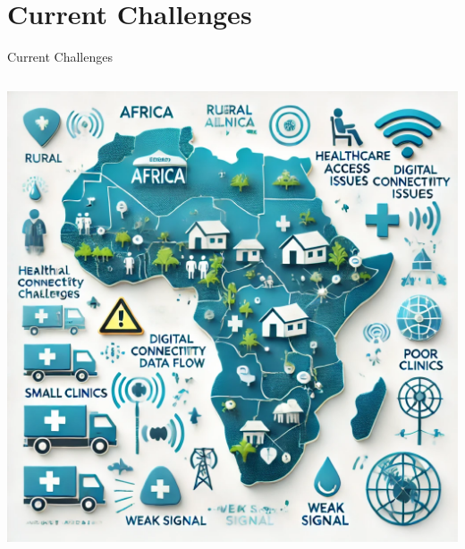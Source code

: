 \documentclass[aspectratio=169]{beamer}
\begin{document}
\section{Current Challenges}
\begin{frame}{Current Challenges}
    \begin{columns}[T]
        \begin{center}
            \includegraphics[height=0.8\textheight]{problem_illustration.png}
        \end{center}
    \end{columns}
\end{frame}

\end{document}
